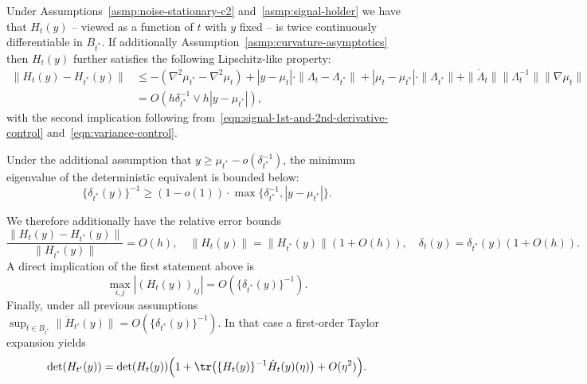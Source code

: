 \documentclass{article}
\begin{document}
	Under Assumptions~\ref{asmp:noise-stationary-c2} and~\ref{asmp:signal-holder} we have that $H_t(y)$ -- viewed as a function of $t$ with $y$ fixed -- is twice continuously differentiable in $B_{t^*}$. If additionally Assumption~\ref{asmp:curvature-asymptotics} then $H_t(y)$ further satisfies the following Lipschitz-like property:
	\begin{align}
		\|H_t(y) - H_{t^*}(y)\| 
		& \leq -(\nabla^2 \mu_{t^*} - \nabla^2 \mu_{t}) + |y - \mu_t|\cdot \|\Lambda_t - \Lambda_{t^*}\| + |\mu_t - \mu_{t^*}| \cdot \|\Lambda_{t^*}\| + \|\dot{\Lambda}_t\| \|\Lambda_t^{-1}\| \|\nabla \mu_t\| \nonumber \\
		& = O(h\delta_{t^*}^{-1} \vee h|y - \mu_{t^*}|), \label{eqn:deterministic-hessian-continuity}
	\end{align} 
	with the second implication following from~\eqref{eqn:signal-1st-and-2nd-derivative-control} and~\eqref{eqn:variance-control}. 
	
	Under the additional assumption that $y \geq \mu_{t^*} - o(\delta_{t^*}^{-1})$, the minimum eigenvalue of the deterministic equivalent is bounded below:
	\begin{equation}
	\label{eqn:deterministic-hessian-min-eigenvalue}
	\{\delta_{t^*}(y)\}^{-1} \geq (1 - o(1)) \cdot \max\{\delta_{t^*}^{-1}, |y - \mu_{t^*}|\}.
	\end{equation}
	
	We therefore additionally have the relative error bounds
	\begin{equation}
		\label{eqn:deterministic-hessian-norm}
		\frac{\|H_t(y) - H_{t^*}(y)\|}{\|H_{t^*}(y)\|} = O(h), \quad \|H_t(y)\| = \|H_{t^*}(y)\| (1 + O(h)), \quad \delta_{t}(y) = \delta_{t^*}(y) (1 + O(h)).
	\end{equation}
	A direct implication of the first statement above is
	\begin{equation}
		\label{eqn:deterministic-hessian-pointwise}
		\max_{i,j} |(H_t(y))_{ij}| = O(\{\delta_{t^*}(y)\}^{-1}).
	\end{equation}
	Finally, under all previous assumptions $\sup_{t \in B_{t^*}} \|\ddot{H}_{t'}(y)\| = O(\{\delta_{{t^*}}(y)\}^{-1})$. In that case a first-order Taylor expansion yields
	\begin{equation}
		\label{eqn:taylor-expansion-det}
		\det(H_{t'}(y)) = \det(H_{t}(y)) \Big(1 + \tr\big(\{H_{t}(y)\}^{-1} \dot{H}_{t}(y)(\eta)\big) + O(\eta^2)\Big).
	\end{equation}
\end{document}
